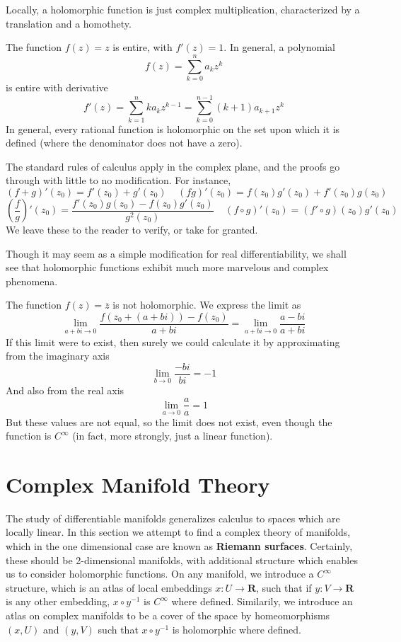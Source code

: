 Locally, a holomorphic function is just complex multiplication, characterized by a translation and a homothety.

\begin{example}
    The function $f(z) = z$ is entire, with $f'(z) = 1$. In general, a polynomial
    \[ f(z) = \sum_{k = 0}^n a_k z^k \]
    is entire with derivative
    \[ f'(z) = \sum_{k = 1}^n k a_k z^{k-1} = \sum_{k = 0}^{n-1} (k + 1) a_{k+1} z^k \]
    In general, every rational function is holomorphic on the set upon which it is defined (where the denominator does not have a zero).
\end{example}

The standard rules of calculus apply in the complex plane, and the proofs go through with little to no modification. For instance,
%
\[ (f + g)'(z_0) = f'(z_0) + g'(z_0)\ \ \ \ \ (fg)'(z_0) = f(z_0)g'(z_0) + f'(z_0)g(z_0) \]
%
\[ \left(\frac{f}{g}\right)'(z_0) = \frac{f'(z_0)g(z_0) - f(z_0)g'(z_0)}{g^2(z_0)}\ \ \ \ \ (f \circ g)'(z_0) = (f' \circ g)(z_0) g'(z_0) \]
%
We leave these to the reader to verify, or take for granted.

Though it may seem as a simple modification for real differentiability, we shall see that holomorphic functions exhibit much more marvelous and complex phenomena.

\begin{example}
    The function $f(z) = \overline{z}$ is not holomorphic. We express the limit as
    \[ \lim_{a + bi \to 0} \frac{f(z_0 + (a + bi)) - f(z_0)}{a + bi} = \lim_{a + bi \to 0} \frac{a - bi}{a + bi} \]
    If this limit were to exist, then surely we could calculate it by approximating from the imaginary axis
    \[ \lim_{b \to 0} \frac{-bi}{bi} = -1 \]
    And also from the real axis
    \[ \lim_{a \to 0} \frac{a}{a} = 1 \]
    But these values are not equal, so the limit does not exist, even though the function is $C^\infty$ (in fact, more strongly, just a linear function).
\end{example}



\section{Complex Manifold Theory}

The study of differentiable manifolds generalizes calculus to spaces which are locally linear. In this section we attempt to find a complex theory of manifolds, which in the one dimensional case are known as {\bf Riemann surfaces}. Certainly, these should be 2-dimensional manifolds, with additional structure which enables us to consider holomorphic functions. On any manifold, we introduce a $C^\infty$ structure, which is an atlas of local embeddings $x:U \to \mathbf{R}$, such that if $y: V \to \mathbf{R}$ is any other embedding, $x \circ y^{-1}$ is $C^\infty$ where defined. Similarily, we introduce an atlas on complex manifolds to be a cover of the space by homeomorphisms $(x,U)$ and $(y,V)$ such that $x \circ y^{-1}$ is holomorphic where defined.

